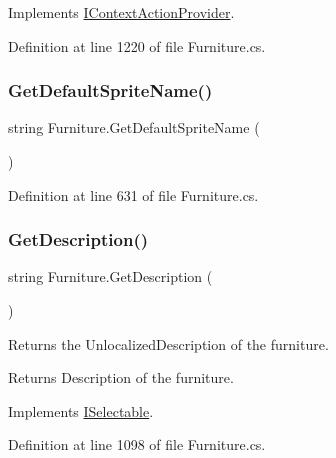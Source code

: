 Implements \hyperlink{interface_i_context_action_provider_acb23b31fd7720af55c607a3c12634d1e}{I\+Context\+Action\+Provider}.



Definition at line 1220 of file Furniture.\+cs.

\mbox{\label{class_furniture_a93e5bf048fbaa6d99f45f15d62b99915}} 
\subsubsection{\texorpdfstring{Get\+Default\+Sprite\+Name()}{GetDefaultSpriteName()}}
{\footnotesize\ttfamily string Furniture.\+Get\+Default\+Sprite\+Name (\begin{DoxyParamCaption}{ }\end{DoxyParamCaption})}



Definition at line 631 of file Furniture.\+cs.

\mbox{\label{class_furniture_af77901f8fc7bfde9ab7dfe55a5bdb57a}} 
\subsubsection{\texorpdfstring{Get\+Description()}{GetDescription()}}
{\footnotesize\ttfamily string Furniture.\+Get\+Description (\begin{DoxyParamCaption}{ }\end{DoxyParamCaption})}



Returns the Unlocalized\+Description of the furniture. 

\begin{DoxyReturn}{Returns}
Description of the furniture.
\end{DoxyReturn}


Implements \hyperlink{interface_i_selectable_a1d8947a443b6214cff01f2d75c8bc75a}{I\+Selectable}.



Definition at line 1098 of file Furniture.\+cs.

\mbox{\label{class_furniture_aaa94fa81a9ef7c7fd7fcc5854fd1ce61}} 
